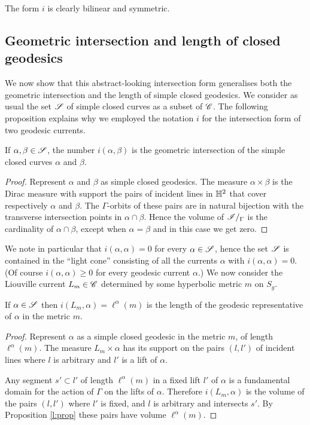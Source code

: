 The form $i$ is clearly bilinear and symmetric. 

\subsection{Geometric intersection and length of closed geodesics}
We now show that this abstract-looking intersection form generalises both the geometric intersection and the length of simple closed geodesics.
We consider as usual the set $\mathscr{S}$ of simple closed curves as a subset of $\mathscr{C}$. The following proposition explains why we employed the notation $i$ for the intersection form of two geodesic currents.

\begin{prop}
If $\alpha, \beta \in \mathscr{S}$, the number $i(\alpha,\beta)$ is the geometric intersection of the simple closed curves $\alpha$ and $\beta$.
\end{prop}
\begin{proof}
Represent $\alpha$ and $\beta$ as simple closed geodesics. The measure $\alpha\times \beta$ is the Dirac measure with support the pairs of incident lines in $\mathbb{H}^2$ that cover respectively $\alpha$ and $\beta$. The $\Gamma$-orbits of these pairs are in natural bijection with the transverse intersection points in $\alpha\cap \beta$. Hence the volume of $\mathscr{I}/_\Gamma$ is the cardinality of $\alpha\cap\beta$, except when $\alpha = \beta$ and in this case we get zero.
\end{proof}

We note in particular that $i(\alpha,\alpha)=0$ for every $\alpha\in\mathscr{S}$, hence the set $\mathscr{S}$ is contained in the ``light cone'' consisting of all the currents $\alpha$ with $i(\alpha,\alpha)=0$. (Of course $i(\alpha, \alpha)\geqslant 0$ for every geodesic current $\alpha$.) We now consider the Liouville current $L_m\in\mathscr{C}$ determined by some hyperbolic metric $m$ on $S_g$.

\begin{prop} \label{i:metric:curve:prop}
If $\alpha\in \mathscr{S}$ then $i(L_m, \alpha) = \ell^\alpha(m)$ is the length of the geodesic representative of $\alpha$ in the metric $m$.
\end{prop}
\begin{proof}
Represent $\alpha$ as a simple closed geodesic in the metric $m$, of length $\ell^\alpha(m)$. The measure $L_m \times \alpha$ has its support on the pairs $(l,l')$ of incident lines where $l$ is arbitrary and $l'$ is a lift of $\alpha$. 

Any segment $s'\subset l'$ of length $\ell^\alpha(m)$ in a fixed lift $l'$ of $\alpha$ is a fundamental domain for the action of $\Gamma$ on the lifts of $\alpha$. Therefore $i(L_m, \alpha)$ is the volume of the pairs $(l,l')$ where $l'$ is fixed, and $l$ is arbitrary and intersects $s'$. By Proposition \ref{l:prop} these pairs have volume $\ell^\alpha(m)$.
\end{proof}

